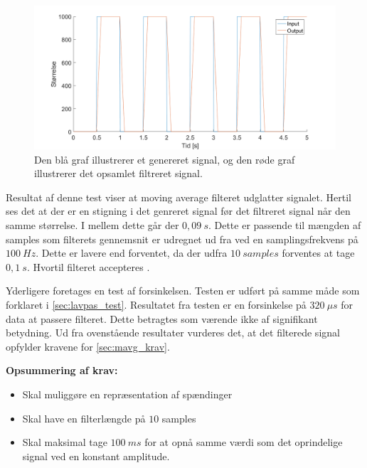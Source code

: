 \begin{figure}[H]
	\centering
	\includegraphics[width=1\textwidth]{figures/forsinkelse}
	\caption{Den blå graf illustrerer et genereret signal, og den røde graf illustrerer det opsamlet filtreret signal.}
	\label{fig:forsinkelse}
\end{figure}

\noindent
Resultat af denne test viser at moving average filteret udglatter signalet. Hertil ses det at der er en stigning i det genreret signal før det filtreret signal når den samme størrelse. I mellem dette går der $0,09~s$. Dette er passende til mængden af samples som filterets gennemsnit er udregnet ud fra ved en samplingsfrekvens på $100~Hz$. 
Dette er lavere end forventet, da der udfra $10~samples$ forventes at tage $0,1~s$. Hvortil filteret accepteres .  

Yderligere foretages en test af forsinkelsen. Testen er udført på samme måde som forklaret i \autoref{sec:lavpas_test}. Resultatet fra testen er en forsinkelse på $320~\mu s$ for data at passere filteret. Dette betragtes som værende ikke af signifikant betydning.    
Ud fra ovenstående resultater vurderes det, at det filterede signal opfylder kravene for \autoref{sec:mavg_krav}. 


\vspace{3mm}
\textbf{Opsummering af krav:}
\begin{itemize}
\item[\text{\sffamily \checkmark}] Skal muliggøre en repræsentation af spændinger 
\item[\text{\sffamily \checkmark}] Skal have en filterlængde på $10$ samples
\item[\text{\sffamily \checkmark}] Skal maksimal tage $100~ms$ for at opnå samme værdi som det oprindelige signal ved en konstant amplitude.
\end{itemize}
